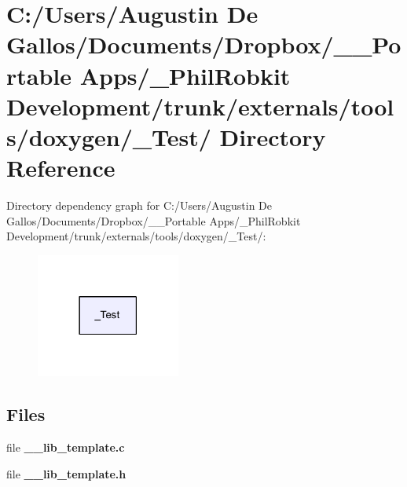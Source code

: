 \section{C\-:/\-Users/\-Augustin De Gallos/\-Documents/\-Dropbox/\-\_\-\-\_\-\-Portable Apps/\-\_\-\-Phil\-Robkit Development/trunk/externals/tools/doxygen/\-\_\-\-Test/ Directory Reference}
\label{dir_3011d34d310587bdf4dde72eb7cb17a9}
Directory dependency graph for C\-:/\-Users/\-Augustin De Gallos/\-Documents/\-Dropbox/\-\_\-\-\_\-\-Portable Apps/\-\_\-\-Phil\-Robkit Development/trunk/externals/tools/doxygen/\-\_\-\-Test/\-:
\nopagebreak
\begin{figure}[H]
\begin{center}
\leavevmode
\includegraphics[width=134pt]{dir_3011d34d310587bdf4dde72eb7cb17a9_dep}
\end{center}
\end{figure}
\subsection*{Files}
\begin{DoxyCompactItemize}
\item 
file {\bf \-\_\-\-\_\-lib\-\_\-template.\-c}
\item 
file {\bf \-\_\-\-\_\-lib\-\_\-template.\-h}
\end{DoxyCompactItemize}
